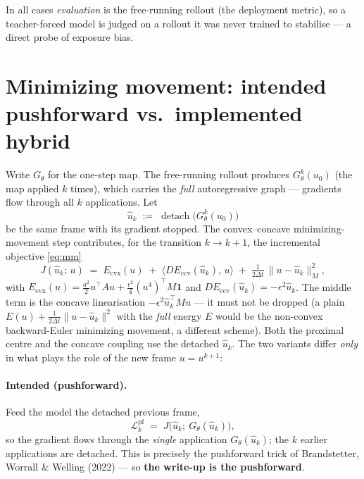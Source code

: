 \documentclass[11pt]{article}
\newcommand{\dt}{\Delta t}
\newcommand{\uhat}{\hat u}
\begin{document}
\noindent In all cases \emph{evaluation} is the free-running rollout (the deployment metric), so a
teacher-forced model is judged on a rollout it was never trained to stabilise --- a direct probe of
exposure bias.

\section{Minimizing movement: intended pushforward vs.\ implemented hybrid}
\label{sec:mm-pf}

Write $G_\theta$ for the one-step map. The free-running rollout produces $G^k_\theta(u_0)$ (the map
applied $k$ times), which carries the \emph{full} autoregressive graph --- gradients flow through
all $k$ applications. Let
\begin{equation}
  \uhat_k \;:=\; \operatorname{detach}\big(G^k_\theta(u_0)\big)
\end{equation}
be the same frame with its gradient stopped. The convex--concave minimizing-movement step
contributes, for the transition $k\!\to\!k+1$, the incremental objective \eqref{eq:mm}
\begin{equation}
  J(\uhat_k;\,u) \;=\; E_{\mathrm{cvx}}(u)
    \;+\; \big\langle DE_{\mathrm{ccv}}(\uhat_k),\,u\big\rangle
    \;+\; \tfrac{1}{2\dt}\,\|u-\uhat_k\|_M^2 ,
  \label{eq:mm-inc}
\end{equation}
with $E_{\mathrm{cvx}}(u)=\tfrac{a^2}{2}u^\top A u+\tfrac{\epsilon^2}{4}(u^4)^\top M\mathbf 1$ and
$DE_{\mathrm{ccv}}(\uhat_k)=-\epsilon^2\uhat_k$. The middle term is the concave linearisation
$-\epsilon^2\uhat_k^\top M u$ --- it must not be dropped (a plain $E(u)+\tfrac1{2\dt}\|u-\uhat_k\|^2$
with the \emph{full} energy $E$ would be the non-convex backward-Euler minimizing movement, a
different scheme). Both the proximal centre and the concave coupling use the detached $\uhat_k$. The
two variants differ \emph{only} in what plays the role of the new frame $u=u^{k+1}$:

\paragraph{Intended (pushforward).} Feed the model the detached previous frame,
\begin{equation}
  \mathcal L^{\mathrm{pf}}_k \;=\; J\big(\uhat_k;\ G_\theta(\uhat_k)\big),
\end{equation}
so the gradient flows through the \emph{single} application $G_\theta(\uhat_k)$; the $k$ earlier
applications are detached. This is precisely the pushforward trick of Brandstetter, Worrall \&
Welling (2022) --- so \textbf{the write-up is the pushforward}.
\end{document}
